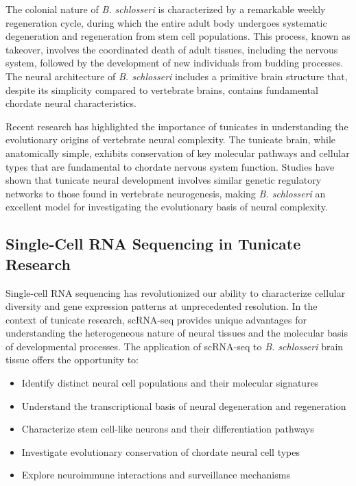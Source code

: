 \documentclass[12pt,a4paper]{article}
\begin{document}
The colonial nature of \textit{B. schlosseri} is characterized by a remarkable weekly regeneration cycle, during which the entire adult body undergoes systematic degeneration and regeneration from stem cell populations. This process, known as takeover, involves the coordinated death of adult tissues, including the nervous system, followed by the development of new individuals from budding processes. The neural architecture of \textit{B. schlosseri} includes a primitive brain structure that, despite its simplicity compared to vertebrate brains, contains fundamental chordate neural characteristics.

Recent research has highlighted the importance of tunicates in understanding the evolutionary origins of vertebrate neural complexity. The tunicate brain, while anatomically simple, exhibits conservation of key molecular pathways and cellular types that are fundamental to chordate nervous system function. Studies have shown that tunicate neural development involves similar genetic regulatory networks to those found in vertebrate neurogenesis, making \textit{B. schlosseri} an excellent model for investigating the evolutionary basis of neural complexity.

\subsection{Single-Cell RNA Sequencing in Tunicate Research}

Single-cell RNA sequencing has revolutionized our ability to characterize cellular diversity and gene expression patterns at unprecedented resolution. In the context of tunicate research, scRNA-seq provides unique advantages for understanding the heterogeneous nature of neural tissues and the molecular basis of developmental processes. The application of scRNA-seq to \textit{B. schlosseri} brain tissue offers the opportunity to:

\begin{itemize}
\item Identify distinct neural cell populations and their molecular signatures
\item Understand the transcriptional basis of neural degeneration and regeneration
\item Characterize stem cell-like neurons and their differentiation pathways
\item Investigate evolutionary conservation of chordate neural cell types
\item Explore neuroimmune interactions and surveillance mechanisms
\end{itemize}
\end{document}
